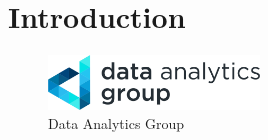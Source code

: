 \chapter{Introduction}

\lipsum[1-4]

\begin{figure}[h]
\centering
\includegraphics[width=0.5\textwidth]{img/data_analytics_group.png}
\caption[Data Analytics Group]{Data Analytics Group}
\label{fig:data_analytics_group}
\end{figure}

\lipsum[5]